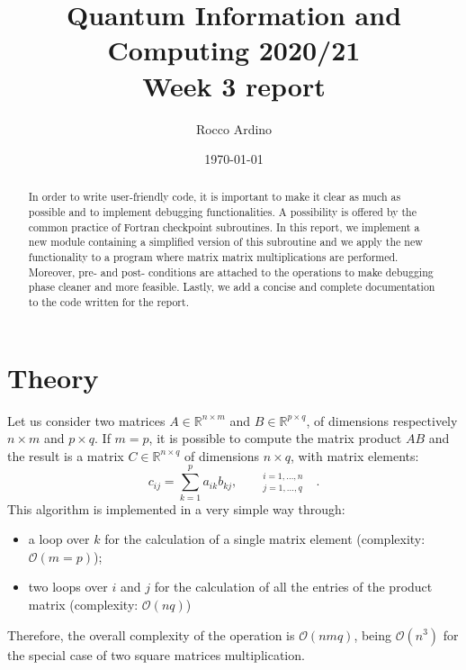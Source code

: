 \documentclass[pra, onecolumn, notitlepage, floats, 11pt]{revtex4-1}
\begin{document}
\title{Quantum Information and Computing 2020/21\\Week 3 report}

\author{Rocco Ardino}

\date{\today}





\begin{abstract}
In order to write user-friendly code, it is important to make it clear as much as possible and to implement debugging functionalities. A possibility is offered by the common practice of Fortran checkpoint subroutines. In this report, we implement a new module containing a simplified version of this subroutine and we apply the new functionality to a program where matrix matrix multiplications are performed. Moreover, pre- and post- conditions are attached to the operations to make debugging phase cleaner and more feasible. Lastly, we add a concise and complete documentation to the code written for the report.
\end{abstract}

\maketitle


\section{Theory}
Let us consider two matrices \( A \in \mathbb{R}^{n \times m} \) and \( B \in \mathbb{R}^{p \times q} \), of dimensions respectively \( n \times m \) and \( p \times q \). If \( m = p \), it is possible to compute the matrix product \( AB \) and the result is a matrix \( C \in \mathbb{R}^{n \times q} \) of dimensions \( n \times q \), with matrix elements:
\begin{equation}
    c_{ij}
    =
    \sum_{k=1}^{p} a_{ik} b_{kj},
    \qquad
    ^{i=1,\dots,n}_{j=1,\dots,q}
    \quad .
    \label{eq:03_T_MATMUL}
\end{equation}
This algorithm is implemented in a very simple way through:
\begin{itemize}
    \item a loop over \( k \) for the calculation of a single matrix element (complexity: \( \mathcal{O}(m=p) \));
    \item two loops over \( i \) and \( j \) for the calculation of all the entries of the product matrix (complexity: \( \mathcal{O}(nq) \))
\end{itemize}
Therefore, the overall complexity of the operation is \( \mathcal{O}(nmq) \), being \( \mathcal{O}(n^3) \) for the special case of two square matrices multiplication.
\end{document}
